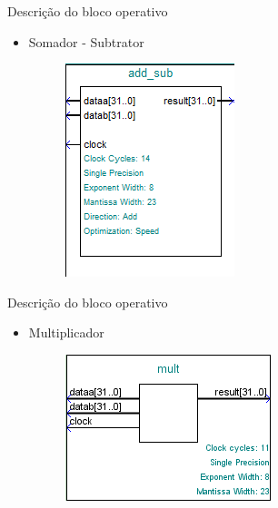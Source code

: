 \documentclass[11pt]{beamer}
\begin{document}
\begin{frame}{Descrição do bloco operativo}
	\begin{itemize}
	\item Somador - Subtrator
	\begin{figure}[ht]
	\centering
	\includegraphics[width=.5\textwidth]{add_sub}
	\label{fig:add_sub}
	\end{figure}
	\end{itemize}
\end{frame}

\begin{frame}{Descrição do bloco operativo}
	\begin{itemize}
	\item Multiplicador
	\begin{figure}[ht]
	\centering
	\includegraphics[width=.5\textwidth]{mult}
	\label{fig:mult}
	\end{figure}
	\end{itemize}
\end{frame}
\end{document}

